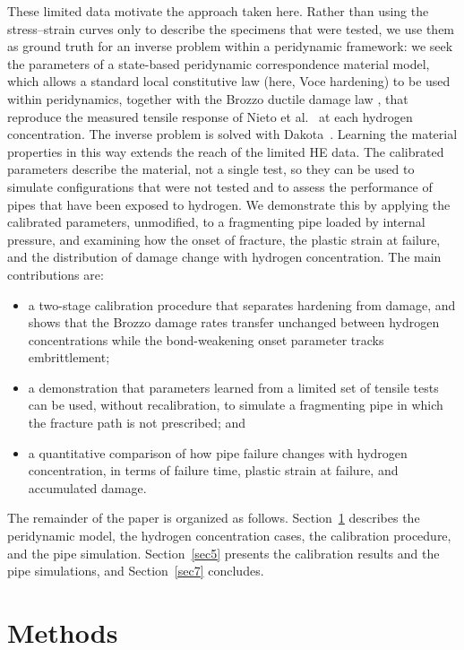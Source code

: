 \documentclass[pdflatex,sn-mathphys-num]{sn-jnl}%
\theoremstyle{thmstyleone}%
\theoremstyle{thmstyletwo}%
\theoremstyle{thmstylethree}%
\begin{document}
These limited data motivate the approach taken here. Rather than using the stress--strain curves only to describe the specimens that were tested, we use them as ground truth for an inverse problem within a peridynamic framework: we seek the parameters of a state-based peridynamic correspondence material model, which allows a standard local constitutive law (here, Voce hardening) to be used within peridynamics, together with the Brozzo ductile damage law \cite{behzadinasab2020revisiting}, that reproduce the measured tensile response of Nieto et al.~\cite{nieto2024thesis} at each hydrogen concentration. The inverse problem is solved with Dakota~\cite{dakota2025}. Learning the material properties in this way extends the reach of the limited HE data. The calibrated parameters describe the material, not a single test, so they can be used to simulate configurations that were not tested and to assess the performance of pipes that have been exposed to hydrogen. We demonstrate this by applying the calibrated parameters, unmodified, to a fragmenting pipe loaded by internal pressure, and examining how the onset of fracture, the plastic strain at failure, and the distribution of damage change with hydrogen concentration. The main contributions are:
\begin{itemize}
\item a two-stage calibration procedure that separates hardening from damage, and shows that the Brozzo damage rates transfer unchanged between hydrogen concentrations while the bond-weakening onset parameter tracks embrittlement;
\item a demonstration that parameters learned from a limited set of tensile tests can be used, without recalibration, to simulate a fragmenting pipe in which the fracture path is not prescribed; and
\item a quantitative comparison of how pipe failure changes with hydrogen concentration, in terms of failure time, plastic strain at failure, and accumulated damage.
\end{itemize}

The remainder of the paper is organized as follows. Section~\ref{sec2} describes the peridynamic model, the hydrogen concentration cases, the calibration procedure, and the pipe simulation. Section~\ref{sec5} presents the calibration results and the pipe simulations, and Section~\ref{sec7} concludes.

\section{Methods}\label{sec2}
\end{document}
